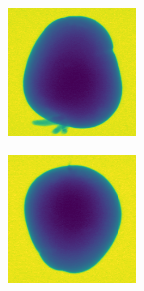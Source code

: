 \documentclass[11pt]{article}
\begin{document}
\begin{figure}[!h]
\begin{subfigure}[b]{0.22\textwidth}
         \caption{}
         \label{fig:perfect_9}
     \end{subfigure}
     \hfill
     \begin{subfigure}[b]{0.22\textwidth}
         \centering
         \includegraphics[width=\textwidth]{figurer/potato_dataset/perfect/perfect_10.jpg}
         \caption{}
         \label{fig:perfect_10}
     \end{subfigure}
     \hfill
     \begin{subfigure}[b]{0.22\textwidth}
         \centering
         \includegraphics[width=\textwidth]{figurer/potato_dataset/perfect/perfect_11.jpg}

\end{subfigure}
\end{figure}
\end{document}
